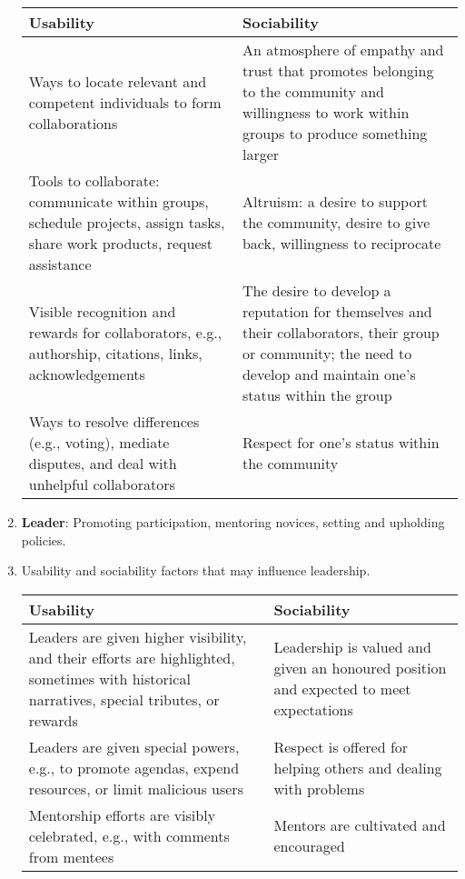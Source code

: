 \documentclass[11pt]{scrartcl}
\begin{document}
\begin{enumerate}
		\begin{tabular}{ | p{6,5cm} | p{} |}
			\hline
			Usability & Sociability\\ \hline
			Ways to locate relevant and competent individuals to form collaborations & An atmosphere of empathy and trust that promotes belonging to the community and willingness to work within groups to produce something larger\\ \hline
			Tools to collaborate: communicate within groups, schedule projects, assign tasks, share work products, request assistance & Altruism: a desire to support the community, desire to give back, willingness to reciprocate\\ \hline
			Visible recognition and rewards for collaborators, e.g., authorship, citations, links, acknowledgements & The desire to develop a reputation for themselves and their collaborators, their group or community; the need to develop and maintain one’s status within the group\\ \hline
			Ways to resolve differences (e.g., voting), mediate disputes, and deal with unhelpful collaborators & Respect for one’s status within the community\\ \hline
		\end{tabular}

		\item \textbf{Leader}: Promoting participation, mentoring novices, setting and upholding policies.
		
		\item Usability and sociability factors that may influence leadership.

		\begin{tabular}{ | p{} | p{} |}
			\hline
			Usability & Sociability\\ \hline
			Leaders are given higher visibility, and their efforts are highlighted, sometimes with historical narratives, special tributes, or rewards & Leadership is valued and given an honoured position and expected to meet expectations\\ \hline
			Leaders are given special powers, e.g., to promote agendas, expend resources, or limit malicious users & Respect is offered for helping others and dealing with problems\\ \hline
			Mentorship efforts are visibly celebrated, e.g., with comments from mentees & Mentors are cultivated and encouraged\\ \hline
		\end{tabular}

	\end{enumerate}
\end{document}
